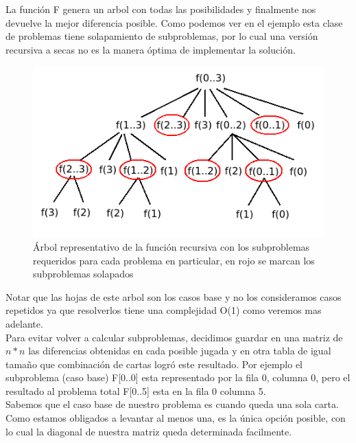 La funci\'on F genera un arbol con todas las posibilidades y finalmente nos devuelve la mejor diferencia posible. Como podemos ver en el ejemplo esta clase de problemas tiene solapamiento de subproblemas, por lo cual una versi\'on recursiva a secas no es la manera \'optima de implementar la soluci\'on. 

\begin{figure}[h]
\begin{center}
\includegraphics[scale=0.6]{./img/ej1_res1.png}
\caption{\'Arbol representativo de la funci\'on recursiva con los subproblemas requeridos para cada problema en particular, en rojo se marcan los subproblemas solapados}
\end{center}
\end{figure}

Notar que las hojas de este arbol son los casos base y no los consideramos casos repetidos ya que resolverlos tiene una complejidad O(1) como veremos mas adelante. \\

Para evitar volver a calcular subproblemas, decidimos guardar en una matriz de $n*n$ las diferencias obtenidas en cada posible jugada y en otra tabla de igual tama\~no que combinaci\'on de cartas logr\'o este resultado. Por ejemplo el subproblema (caso base) F[0..0] esta representado por la fila 0, columna 0, pero el resultado al problema total F[0..5] esta en la fila 0 columna 5.\\

Sabemos que el caso base de nuestro problema es cuando queda una sola carta. Como estamos obligados a levantar al menos una, es la \'unica opci\'on posible, con lo cual la diagonal de nuestra matriz queda determinada facilmente. 

